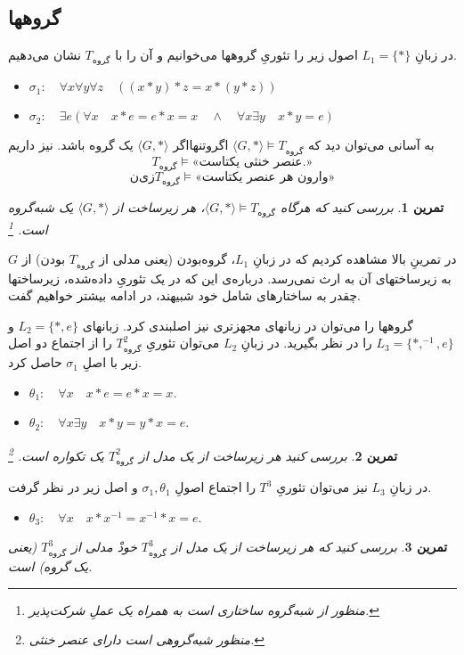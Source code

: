 \documentclass[12pt,a4paper]{report}
\theoremstyle{colorhead}
\newtheorem{tam}{تمرین}
\begin{document}
\subsection{گروهها }
در زبانِ
$L_1=\{*\}$
اصول زیر را تئوری‌ِ‌ گروهها می‌خوانیم و آن را با
$T_{\text{گروه}}$
نشان می‌دهیم.
\begin{itemize}
\item 
$\sigma_1: \quad \forall x\forall y\forall z \quad \left((x*y)*z=x*(y*z)\right)$
\item $\sigma_2: \quad \exists e \left( \forall x\quad  x*e=e*x=x\quad \wedge\quad  \forall x
 \exists y \quad x*y=e\right)$
\end{itemize}
به آسانی می‌توان دید که
$\langle G,*\rangle \models T_{\text{گروه}}$
اگروتنهااگر
$\langle G,*\rangle$
یک گروه باشد. نیز داریم
\[
T_{\text{گروه}}\models \text{«عنصر خنثی یکتاست.»}
\]
\[
نیز
T_{\text{گروه}}\models \text{«وارون هر عنصر یکتاست»}
\]
\begin{tam}
بررسی کنید که هرگاه
$\langle G,*\rangle \models T_{\text{گروه}}$،
هر زیرساخت از
$\langle G,*\rangle$
یک شبه‌گروه
است.
\footnote{منظور از شبه‌گروه ساختاری است به همراه یک عملِ شرکت‌پذیر.}
\end{tam}
در تمرینِ بالا مشاهده کردیم که در زبانِ
$L_1$،
گروه‌بودن (یعنی مدلی از
$T_{\text{گروه}}$
بودن)
از
$G$
به زیرساختهای آن به ارث نمی‌رسد. درباره‌ی این که در یک تئوریِ داده‌شده،‌ 
زیرساختها چقدر به ساختارهای شامل خود شبیهند، در ادامه بیشتر خواهیم گفت.
\par 
گروهها را می‌توان در زبانهای مجهزتری نیز اصلبندی کرد. زبانهای
$L_2=\{*,e\}$
و
\mbox{$L_3=\{*,^{-1},e\}$}
را در نظر بگیرید. در زبانِ
$L_2$
می‌توان تئوریِ
$T^2_{\text{گروه}}$
را از اجتماع دو اصل زیر با اصلِ
$\sigma_1$
حاصل کرد.
\begin{itemize}
\item 
$\theta_1:\quad \forall x \quad x*e=e*x=x$.
\item 
$\theta_2:\quad \forall x\exists y\quad x*y=y*x=e$.
\end{itemize}
\begin{tam}
بررسی کنید هر زیرساخت از یک مدل از
$T^2_{\text{گروه}}$
یک تکواره
است.
\footnote{منظور شبه‌گروهی است دارای عنصر خنثی.}
\end{tam}
در زبانِ
$L_3$
نیز می‌توان تئوریِ
$T^3_{\text{}}$
را اجتماع اصولِ
$\sigma_1,\theta_1$
و
اصل زیر در نظر گرفت.
\begin{itemize}
\item $\theta_3:\quad \forall x\quad x*x^{-1}=x^{-1}*x=e$.
\end{itemize}
\begin{tam}
بررسی کنید که هر زیرساخت از یک مدل از 
$T^3_{\text{گروه}}$
خودْ مدلی از
$T^3_{\text{گروه}}$
(یعنی یک گروه) است.
\end{tam}
\end{document}
